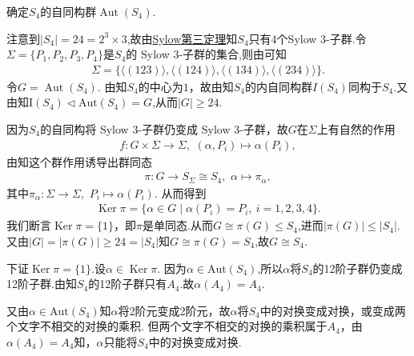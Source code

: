 \documentclass[../../main.tex]{subfiles}%
\begin{document}
\begin{example}
确定$S_4$的自同构群$\operatorname{Aut}(S_4)$.
\end{example}
\begin{solution}

注意到$|S_4|=24=2^3\times 3$,故由\hyperref[theorem:Sylow第三定理]{Sylow第三定理}知$S_4$只有4个Sylow 3-子群.令$\Sigma = \{P_1, P_2, P_3, P_4\}$是$S_4$的 Sylow 3-子群的集合,则由可知
\begin{align*}
\Sigma = \{\langle(123)\rangle, \langle(124)\rangle, \langle(134)\rangle, \langle(234)\rangle\}.
\end{align*}
令$G = \operatorname{Aut}(S_4)$. 由知$S_4$的中心为$1$，故由知$S_4$的内自同构群$I(S_4)$同构于$S_4$.又由知$\text{I}(S_4)\lhd \text{Aut}(S_4)=G$,从而$|G| \geqslant 24$.

因为$S_4$的自同构将 Sylow 3-子群仍变成 Sylow 3-子群，故$G$在$\Sigma$上有自然的作用
\begin{align*}
f:G\times \Sigma\to \Sigma ,\,\,(\alpha,P_i)\mapsto \alpha(P_i),
\end{align*}
由知这个群作用诱导出群同态
\begin{align*}
\pi: G \to S_\Sigma \cong S_4,\,\,\alpha\mapsto \pi_{\alpha},
\end{align*}
其中$\pi_\alpha:\Sigma \to \Sigma,\,\,P_i\mapsto \alpha(P_i)$.
从而得到
\begin{align*}
\operatorname{Ker}\pi = \{\alpha \in G \mid \alpha(P_i) = P_i,\ i = 1,2,3,4\}.
\end{align*}
我们断言$\operatorname{Ker}\pi = \{1\}$，即$\pi$是单同态.从而$G\cong \pi(G)\leqslant S_4$,进而$|\pi(G)|\leqslant |S_4|$.
又由$|G|=|\pi(G)| \geqslant 24=|S_4|$知$G\cong \pi(G) = S_4$,故$G \cong S_4$.

下证$\operatorname{Ker}\pi = \{1\}$.设$\alpha \in \operatorname{Ker}\pi$. 因为$\alpha\in \text{Aut}(S_4)$,所以$\alpha$将$S_4$的12阶子群仍变成12阶子群.由知$S_4$的12阶子群只有$A_4$.故$\alpha(A_4) = A_4$.

又由$\alpha\in \text{Aut}(S_4)$知$\alpha$将2阶元变成2阶元，故$\alpha$将$S_4$中的对换变成对换，或变成两个文字不相交的对换的乘积. 但两个文字不相交的对换的乘积属于$A_4$，由$\alpha(A_4) = A_4$知，$\alpha$只能将$S_4$中的对换变成对换.


\end{solution}
\end{document}

